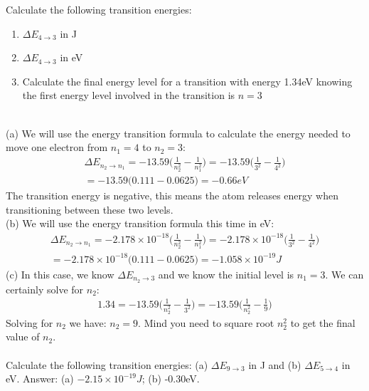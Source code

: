 \documentclass[main.tex]{subfiles}
\begin{document}
\begin{description}
\begin{example} %
Calculate the following transition energies:
\begin{enumerate}[label=(\alph*)]
\item $\Delta E_{4\rightarrow 3}$ in J
\item $\Delta E_{4\rightarrow 3}$  in eV
\item Calculate the final energy level for a transition with energy 1.34eV knowing the first energy level involved in the transition is $n=3$
\end{enumerate}
\\
(a) We will use the energy transition formula to calculate the energy needed to move one electron from $n_1=4$ to $n_2=3$:
\begin{equation*}\begin{split}
\Delta E_{n_2\rightarrow n_1}=-13.59 \Bigg( \frac{1}{n_2^2}-\frac{1}{n_1^2}\Bigg)  =-13.59\Bigg( \frac{1}{3^2}-\frac{1}{4^2}\Bigg)\\
=-13.59\Bigg( 0.111- 0.0625 \Bigg)=-0.66eV
\end{split}\end{equation*}
The transition energy is negative, this means the atom releases energy when transitioning between these two levels.\\
(b) We will use the energy transition formula this time in eV:
\begin{equation*}\begin{split}
\Delta E_{n_2\rightarrow n_1}=-2.178\times 10^{-18} \Bigg( \frac{1}{n_2^2}-\frac{1}{n_1^2}\Bigg)  =-2.178\times 10^{-18}\Bigg( \frac{1}{3^2}-\frac{1}{4^2}\Bigg)\\
=-2.178\times 10^{-18}\Bigg( 0.111- 0.0625 \Bigg)=-1.058\times 10^{-19}J
\end{split}\end{equation*}
(c) In this case, we know $\Delta E_{n_2\rightarrow 3}$ and we know the initial level is $n_1=3$. We can certainly solve for $n_2$:
\begin{equation*}\begin{split}
1.34=-13.59 \Bigg( \frac{1}{n_2^2}-\frac{1}{3^2}\Bigg)  =-13.59\Bigg( \frac{1}{n_2^2}-\frac{1}{9}\Bigg)
\end{split}\end{equation*}
Solving for $n_2$ we have: $n_2=9$. Mind you need to square root $n_2^2$ to get the final value of $n_2$.\\
\faDiamond\ \\
Calculate the following transition energies:
(a) $\Delta E_{9\rightarrow 3}$ in J and (b) $\Delta E_{5\rightarrow 4}$  in eV.
\flushright Answer: (a) $-2.15\times 10^{-19}J$; (b) -0.30eV.
\end{example}%




\end{description}
\end{document}
